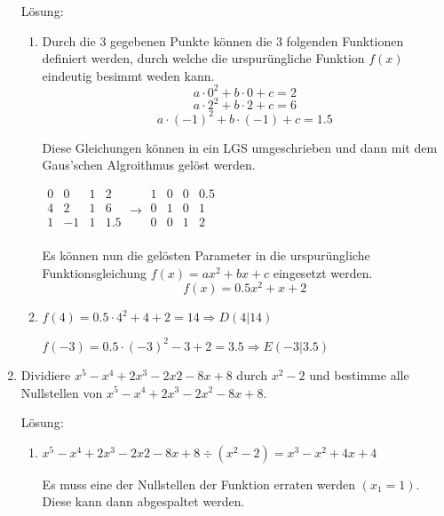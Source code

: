 \documentclass[../main.tex]{subfiles}
\begin{document}
\begin{enumerate}
	      Lösung:
	      \begin{enumerate}
		      \item Durch die \( 3 \) gegebenen Punkte können die \( 3 \) folgenden Funktionen
		            definiert werden, durch welche die urspurüngliche Funktion \( f(x) \) eindeutig besimmt weden kann.
		            \[ a \cdot 0^2 + b \cdot 0 + c = 2 \]
		            \[ a \cdot 2^2 + b \cdot 2 + c = 6 \]
		            \[ a \cdot (-1)^2 + b \cdot (-1) + c = 1.5 \]

		            Diese Gleichungen können in ein LGS umgeschrieben und dann mit dem
		            Gaus'schen Algroithmus gelöst werden.

		            \( \begin{array}{ccc|c}
			            0 & 0  & 1 & 2   \\
			            4 & 2  & 1 & 6   \\
			            1 & -1 & 1 & 1.5 \\
		            \end{array}
		            \rightarrow
		            \begin{array}{ccc|c}
			            1 & 0 & 0 & 0.5 \\
			            0 & 1 & 0 & 1   \\
			            0 & 0 & 1 & 2   \\
		            \end{array} \)

		            Es können nun die gelösten Parameter in die urspurüngliche Funktionsgleichung
		            \( f(x) = ax^2 + bx + c \) eingesetzt werden.
		            \[ f(x) = 0.5 x^2 + x + 2 \]

		      \item \( f(4) = 0.5 \cdot 4^2 + 4 + 2 = 14  \Rightarrow D(4|14) \)

		            \( f(-3) = 0.5 \cdot (-3)^2 -3 + 2 = 3.5  \Rightarrow E(-3|3.5) \)
	      \end{enumerate}
	\item Dividiere \( x^5 - x^4 + 2x^3 -2x2 -8x +8 \) durch \( x^2 - 2 \)
	      und bestimme alle Nullstellen von \( x^5 - x^4 + 2x^3 - 2x^2 - 8x +8 \).

	      Lösung:
	      \begin{enumerate}
		      \item \( x^5 - x^4 + 2x^3 -2x2 -8x +8  \div (x^2 -2) = x^3 -x^2 + 4x +4 \)

		            Es muss eine der Nullstellen der Funktion erraten werden \( (x_1=1) \).
		            Diese kann dann abgespaltet werden.


\end{enumerate}
\end{enumerate}
\end{document}
